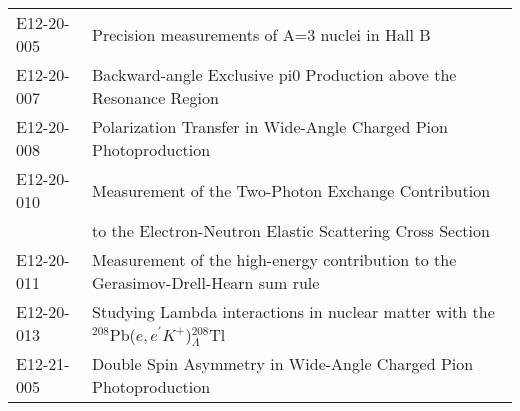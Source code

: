 \begin{tabular}{ll}
E12-20-005 & Precision measurements of A=3 nuclei in Hall B\\
E12-20-007 & Backward-angle Exclusive pi0 Production above the Resonance Region\\
E12-20-008 & Polarization Transfer in Wide-Angle Charged Pion Photoproduction\\
E12-20-010 & Measurement of the Two-Photon Exchange Contribution\\
& to the Electron-Neutron Elastic Scattering Cross Section\\
E12-20-011 & Measurement of the high-energy contribution to the Gerasimov-Drell-Hearn sum rule\\
E12-20-013 & Studying Lambda interactions in nuclear matter with the $^{208}$Pb($e,e^\prime K^+$)$^{208}_\Lambda$Tl\\
E12-21-005 & Double Spin Asymmetry in Wide-Angle Charged Pion Photoproduction
\end{tabular}
\clearpage